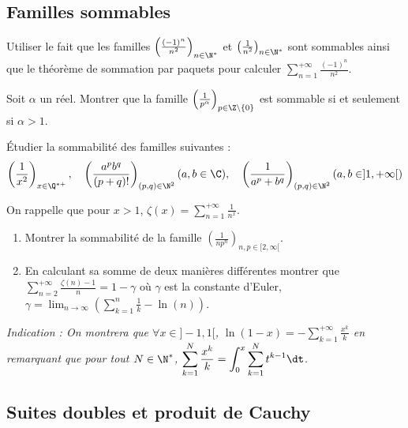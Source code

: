 \subsection{Familles sommables}

\begin{exercice}
    Utiliser le fait que les familles $\left(\frac{(-1)^{n}}{n^{2}}\right)_{n\in \N^{*}}$ et $\left(\frac{1}{n^{2}}\right)_{n\in \N^{*}}$ 
    sont sommables ainsi que le théorème de sommation par paquets pour calculer $\displaystyle \sum_{n=1}^{+\infty}\frac{(-1)^{n}}{n^{2}}$.
\end{exercice}

\begin{exercice}
    Soit $\alpha$ un réel. Montrer que la famille $\left(\frac{1}{p^{\alpha}}\right)_{p\in \Z\setminus\{0\}}$ est sommable si et seulement si $\alpha>1$.
\end{exercice}

\begin{exercice}
    Étudier la sommabilité des familles suivantes :
    \[\left(\frac{1}{x^{2}}\right)_{x\in \Q^{*+}}, \quad \left(\frac{a^{p}b^{q}}{(p+q)!}\right)_{(p,q)\in \N^{2}}(a,b\in\C), \quad \left(\frac{1}{a^{p}+b^{q}}\right)_{(p,q)\in \N^{2}}(a,b\in]1,+\infty[)\]
\end{exercice}

\begin{exercice}
    On rappelle que pour $x>1$, $\displaystyle \zeta(x)=\sum_{n=1}^{+\infty}\frac{1}{n^{x}}$.
    \begin{enumerate}
        \item Montrer la sommabilité de la famille $\left(\frac{1}{np^{n}}\right)_{n,p\in[2,\infty[}$.
        \item En calculant sa somme de deux manières différentes montrer que 
            $\displaystyle \sum_{n=2}^{+\infty}\frac{\zeta(n)-1}{n}=1-\gamma$ où $\gamma$ est la constante d'Euler,
            $\displaystyle \gamma=\lim_{n\rightarrow\infty}\left(\sum_{k=1}^{n}\frac{1}{k}-\ln(n) \right)$.
    \end{enumerate}
    \textit{Indication : On montrera que $\forall x\in]-1,1[$, $\displaystyle \ln(1-x)=-\sum_{k=1}^{+\infty}\frac{x^{k}}{k}$ 
        en remarquant que pour tout $N \in \N^*$, $\displaystyle \sum_{k=1}^{N}\frac{x^{k}}{k}=\int_{0}^{x}\sum_{k=1}^{N}t^{k-1} \dt$.}
\end{exercice}

\subsection{Suites doubles et produit de Cauchy}

